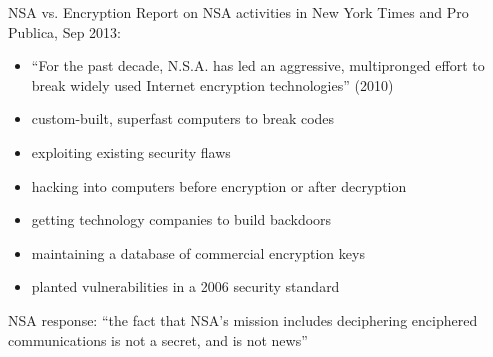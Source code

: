 \documentclass{beamer}
\begin{document}
\begin{frame}{NSA vs. Encryption}
Report on NSA activities in New York Times and Pro Publica, Sep 2013:
\begin{itemize}
\item ``For the past decade, N.S.A. has led an aggressive, multipronged effort to break widely used Internet encryption technologies'' (2010)
\item custom-built, superfast computers to break codes
\item exploiting existing security flaws
\item hacking into computers before encryption or after decryption
\item getting technology companies to build backdoors
\item maintaining a database of commercial encryption keys
\item planted vulnerabilities in a 2006 security standard
\end{itemize}
\bigskip
NSA response: ``the fact that NSA's mission includes deciphering enciphered communications is not a secret, and is not news''
\end{frame}
\end{document}
